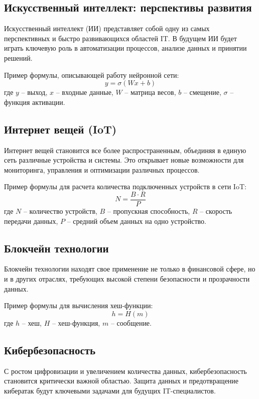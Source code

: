 \subsection{Искусственный интеллект: перспективы развития}
Искусственный интеллект (ИИ) представляет собой одну из самых перспективных и быстро развивающихся областей IT. В будущем ИИ будет играть ключевую роль в автоматизации процессов, анализе данных и принятии решений. 

Пример формулы, описывающей работу нейронной сети:
\begin{equation}
    y = \sigma(Wx + b)
    \label{eq:neural_network}
\end{equation}
где \( y \) -- выход, \( x \) -- входные данные, \( W \) -- матрица весов, \( b \) -- смещение, \( \sigma \) -- функция активации.

\subsection{Интернет вещей (IoT)}
Интернет вещей становится все более распространенным, объединяя в единую сеть различные устройства и системы. Это открывает новые возможности для мониторинга, управления и оптимизации различных процессов. 

Пример формулы для расчета количества подключенных устройств в сети IoT:
\begin{equation}
    N = \frac{B \cdot R}{P}
    \label{eq:iot_devices}
\end{equation}
где \( N \) -- количество устройств, \( B \) -- пропускная способность, \( R \) -- скорость передачи данных, \( P \) -- средний объем данных на одно устройство.

\subsection{Блокчейн технологии}
Блокчейн технологии находят свое применение не только в финансовой сфере, но и в других отраслях, требующих высокой степени безопасности и прозрачности данных. 

Пример формулы для вычисления хеш-функции:
\begin{equation}
    h = H(m)
    \label{eq:blockchain_hash}
\end{equation}
где \( h \) -- хеш, \( H \) -- хеш-функция, \( m \) -- сообщение.

\subsection{Кибербезопасность}
С ростом цифровизации и увеличением количества данных, кибербезопасность становится критически важной областью. Защита данных и предотвращение кибератак будут ключевыми задачами для будущих IT-специалистов.

